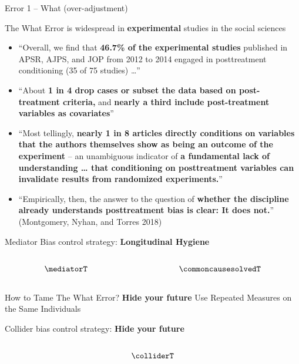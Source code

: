 \documentclass[
  ignorenonframetext,
  aspectratio=169,
]{beamer}
\begin{document}
\begin{frame}[fragile]{Error 1 -- What (over-adjustment)}
\begin{block}{The What Error is widespread in \textbf{experimental}
studies in the social sciences}
\label{the-what-error-is-widespread-in-experimental-studies-in-the-social-sciences}
\begin{itemize}
\item
  ``Overall, we find that \textbf{46.7\% of the experimental studies}
  published in APSR, AJPS, and JOP from 2012 to 2014 engaged in
  posttreatment conditioning (35 of 75 studies) \ldots{}''
\item
  ``About \textbf{1 in 4 drop cases or subset the data based on
  post-treatment criteria,} and \textbf{nearly a third include
  post-treatment variables as covariates}''
\item
  ``Most tellingly, \textbf{nearly 1 in 8 articles directly conditions
  on variables that the authors themselves show as being an outcome of
  the experiment} -- an unambiguous indicator of \textbf{a fundamental
  lack of understanding \ldots{} that conditioning on posttreatment
  variables can invalidate results from randomized experiments.}''
\item
  ``Empirically, then, the answer to the question of \textbf{whether the
  discipline already understands posttreatment bias is clear: It does
  not.}'' (Montgomery, Nyhan, and Torres 2018)
\end{itemize}
\end{block}

\begin{block}{Mediator Bias control strategy: \textbf{Longitudinal
Hygiene}}
\label{mediator-bias-control-strategy-longitudinal-hygiene}
\begin{columns}[T]
\begin{column}{0.5\linewidth}
\[
\mediatorT
\]
\end{column}

\begin{column}{0.5\linewidth}
\[
\commoncausesolvedT
\]
\end{column}
\end{columns}
\end{block}

\begin{block}{How to Tame The What Error? \textbf{Hide your future}}
\label{how-to-tame-the-what-error-hide-your-future}
Use Repeated Measures on the Same Individuals
\end{block}

\begin{block}{Collider bias control strategy: \textbf{Hide your future}}
\label{collider-bias-control-strategy-hide-your-future}
\begin{columns}[T]
\begin{column}{0.5\linewidth}
\[\colliderT\]
\end{column}


\end{columns}
\end{block}
\end{frame}
\end{document}
